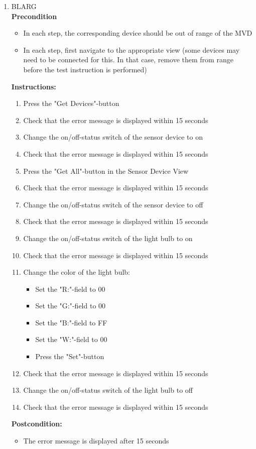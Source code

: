 \documentclass[a4paper]{article}
\newlength{\testlabellength}
\newenvironment{testlist}{\begin{enumerate}[label=\bfseries Instruction \thesubsection.\arabic* , labelindent=0pt, labelwidth=\testlabellength , leftmargin=2cm]}{\end{enumerate}}
\newenvironment{precondition}{
{\color{white}BLARG}\\ 
\textbf{Precondition}
\begin{itemize}[labelindent=0cm, labelwidth=2cm , leftmargin=1cm]
}
{\end{itemize}}
\newenvironment{instruction}{
\textbf{Instructions:}
\begin{enumerate}[label=\bfseries  \arabic*., labelindent=0cm, labelwidth=2cm , leftmargin=1cm]
}
{\end{enumerate}}
\newenvironment{postcondition}{
\textbf{Postcondition:}
\begin{itemize}[labelindent=0cm, labelwidth=2cm , leftmargin=1cm]
}
{\end{itemize}}
\begin{document}
\begin{appendices}
\begin{testlist}
	\item
		\begin{precondition} 
			\item In each step, the corresponding device should be out of range of the MVD
			\item In each step, first navigate to the appropriate view (some devices may need to be connected for this. In that case, remove them from range before the test instruction is performed)
		\end{precondition}
		\begin{instruction}
			\item Press the "Get Devices"-button
			\item Check that the error message is displayed within 15 seconds
			\item Change the on/off-status switch of the sensor device to on
			\item Check that the error message is displayed within 15 seconds
			\item Press the "Get All"-button in the Sensor Device View
			\item Check that the error message is displayed within 15 seconds
			\item Change the on/off-status switch of the sensor device to off
			\item Check that the error message is displayed within 15 seconds
			\item Change the on/off-status switch of the light bulb to on
			\item Check that the error message is displayed within 15 seconds
			\item Change the color of the light bulb:
			\begin{itemize}
				\item Set the "R:"-field to 00
				\item Set the "G:"-field to 00
				\item Set the "B:"-field to FF
				\item Set the "W:"-field to 00
				\item Press the "Set"-button
			\end{itemize}
			\item Check that the error message is displayed within 15 seconds
			\item Change the on/off-status switch of the light bulb to off
			\item Check that the error message is displayed within 15 seconds
		\end{instruction}
		\begin{postcondition}
			\item The error message is displayed after 15 seconds %
		\end{postcondition}


\end{testlist}
\end{appendices}
\end{document}
